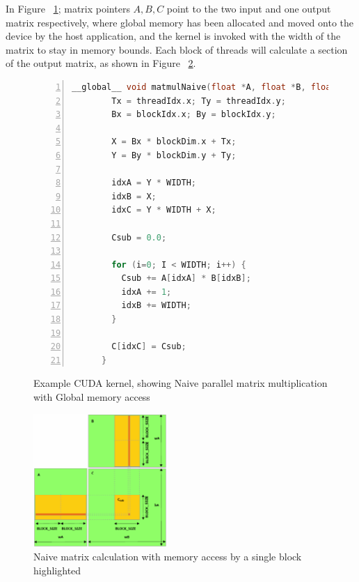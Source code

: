 In Figure ~\ref{fig:MatMulNaive}; matrix pointers \(A, B, C\) point to the two input and one output matrix respectively, where global memory has been allocated and moved onto the device by the host application, and the kernel is invoked with the width of the matrix to stay in memory bounds. Each block of threads will calculate a section of the output matrix, as shown in Figure ~\ref{fig:MatMulNaiveDiag}.

\begin{figure}[!h]
  \centering
    \begin{lstlisting}[numbers=left, language=C, numberstyle=\tiny, numbersep=8pt]
      __global__ void matmulNaive(float *A, float *B, float *C, int WIDTH){
        Tx = threadIdx.x; Ty = threadIdx.y;
        Bx = blockIdx.x; By = blockIdx.y;

        X = Bx * blockDim.x + Tx;
        Y = By * blockDim.y + Ty;

        idxA = Y * WIDTH;   
        idxB = X;
        idxC = Y * WIDTH + X;

        Csub = 0.0;

        for (i=0; I < WIDTH; i++) {
          Csub += A[idxA] * B[idxB];
          idxA += 1;
          idxB += WIDTH;
        }

        C[idxC] = Csub;
      }
    \end{lstlisting}
  \caption{Example CUDA kernel, showing Naive parallel matrix multiplication with Global memory access}
  \label{fig:MatMulNaive}
\end{figure}

\begin{figure}[h!]
\centering
  \includegraphics[width=0.45\textwidth,keepaspectratio=true]{images/naive_matrix.png}
  \caption{Naive matrix calculation with memory access by a single block highlighted}
  \label{fig:MatMulNaiveDiag}
\end{figure}

